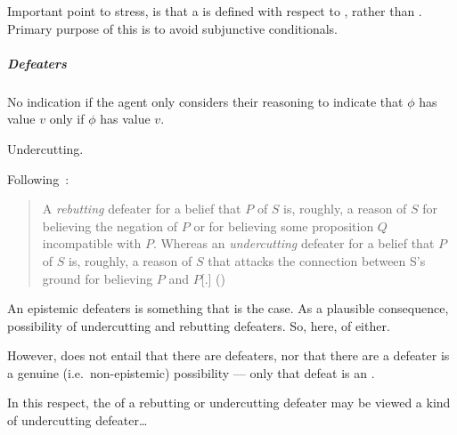 \begin{note}
  Important point to stress, is that a \requ{} is defined with respect to \epVAd{} , rather than \epPAd{} .
  Primary purpose of this is to avoid subjunctive conditionals.
\end{note}

\subparagraph{Defeaters}

\begin{note}
  \begin{proposition}
    No indication if the agent only considers their reasoning to indicate that \(\phi\) has value \(v\) only if \(\phi\) has value \(v\).
  \end{proposition}
\end{note}


\begin{note}
  Undercutting.

  Following~\citeauthor{Moretti:2018va}:
  \begin{quote}
    A \emph{rebutting} defeater for a belief that \(P\) of \(S\) is, roughly, a reason of \(S\) for believing the negation of \(P\) or for believing some proposition \(Q\) incompatible with \(P\).
    Whereas an \emph{undercutting} defeater for a belief that \(P\) of \(S\) is, roughly, a reason of \(S\) that attacks the connection between S's ground for believing \(P\) and \(P\)[.]\nolinebreak
    \mbox{}\hfill\mbox{(\citeyear{Moretti:2018va})}
  \end{quote}
\end{note}

\begin{note}
  An epistemic defeaters is something that is the case.
  As a plausible consequence, possibility of undercutting and rebutting defeaters.
  So, here, \epP{} of either.
\end{note}

\begin{note}
  However, does not entail that there are defeaters, nor that there are a defeater is a genuine (i.e.\ non-epistemic) possibility --- only that defeat is an \epP{}.
\end{note}

\begin{note}
  In this respect, the \epPAd{} of a rebutting or undercutting defeater may be viewed a kind of undercutting defeater\dots
\end{note}

